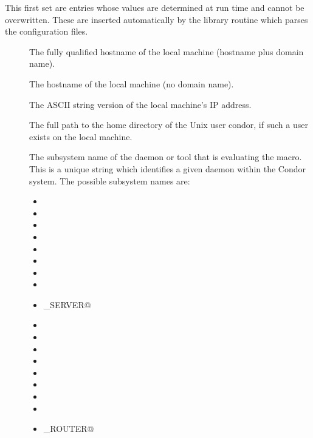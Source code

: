 This first set are entries whose values are determined at
run time and cannot be overwritten.  These are inserted automatically by
the library routine which parses the configuration files.
\begin{description}
  
\item[] \label{param:FullHostname}
  The
  fully qualified hostname of the local machine (hostname plus domain
  name).
  
\item[] \label{param:Hostname}
  The hostname of the local machine (no domain name).
  
\item[] \label{param:IpAddress}
  The ASCII string version of the local machine's IP address.

\item[] \label{param:Tilde}
  The full path to the
  home directory of the Unix user condor, if such a user exists on the
  local machine.

  \label{sec:Condor-Subsystem-Names}
\item[] \label{param:Subsystem}
  The subsystem
  name of the daemon or tool that is evaluating the macro.
  This is a unique string which identifies a given daemon within the
  Condor system.  The possible subsystem names are:

  \begin{itemize}
  \item \verb@STARTD@
  \item \verb@SCHEDD@
  \item \verb@MASTER@
  \item \verb@COLLECTOR@
  \item \verb@NEGOTIATOR@
  \item \verb@KBDD@ 
  \item \verb@SHADOW@
  \item \verb@STARTER@
  \item \verb@CKPT_SERVER@
  \item \verb@SUBMIT@
  \item \verb@GRIDMANAGER@
  \item \verb@TOOL@
  \item \verb@STORK@
  \item \verb@HAD@
  \item \verb@REPLICATION@
  \item \verb@QUILL@
  \item \verb@DBMSD@
  \item \verb@JOB_ROUTER@
    \label{list:subsystem names}
  \end{itemize}

\end{description}

